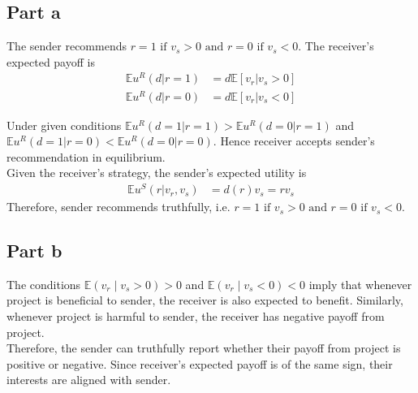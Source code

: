 \subsection*{Part a}

The sender recommends $r = 1 \text{ if } v_s > 0 \text{ and } r = 0 \text{ if } v_s < 0$. The receiver's expected payoff is 
\begin{align*}
    \mathbb E u^R(d| r = 1) &= d\mathbb  E[v_r| v_s > 0]\\
    \mathbb E u^R(d| r = 0) &= d\mathbb  E[v_r| v_s < 0]
\end{align*}

Under given conditions $\mathbb E u^R(d=1| r = 1) > \mathbb E u^R(d=0| r = 1)$ and $\mathbb E u^R(d=1| r = 0) < \mathbb E u^R(d=0| r = 0)$. Hence receiver accepts sender's recommendation in equilibrium. \\

Given the receiver's strategy, the sender's expected utility is 
\begin{align*}
    \mathbb E u^S(r | v_r, v_s) &= d(r) v_s = r v_s
\end{align*}
Therefore, sender recommends truthfully, i.e. $r = 1 \text{ if } v_s > 0 \text{ and } r = 0 \text{ if } v_s < 0$.

\subsection*{Part b}

The conditions $\mathbb{E}(v_r \mid v_s > 0) > 0$ and $\mathbb{E}(v_r \mid v_s < 0) < 0$ imply that whenever project is beneficial to sender, the receiver is also expected to benefit. Similarly, whenever project is harmful to sender, the receiver has negative payoff from project. \\

Therefore, the sender can truthfully report whether their payoff from project is positive or negative. Since receiver's expected payoff is of the same sign, their interests are aligned with sender.

